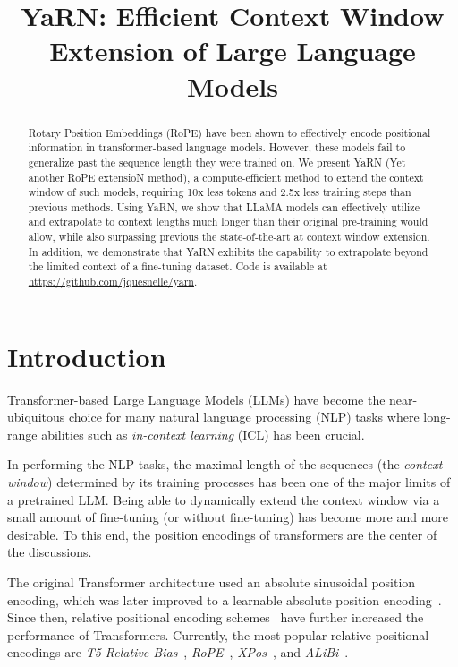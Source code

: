 \title{YaRN: Efficient Context Window Extension of Large Language Models}

\begin{abstract}
Rotary Position Embeddings (RoPE) have been shown to effectively encode positional information in transformer-based language models. However, these models fail to generalize past the sequence length they were trained on. We present YaRN (Yet another RoPE extensioN method), a compute-efficient method to extend the context window of such models, requiring 10x less tokens and 2.5x less training steps than previous methods. Using YaRN, we show that LLaMA models can effectively utilize and extrapolate to context lengths much longer than their original pre-training would allow, while also surpassing previous the state-of-the-art at context window extension. In addition, we demonstrate that YaRN exhibits the capability to extrapolate beyond the limited context of a fine-tuning dataset. Code is available at \url{https://github.com/jquesnelle/yarn}.
\end{abstract}

\section{Introduction}

Transformer-based Large Language Models\citep{vaswani2017attention} (LLMs) have become the near-ubiquitous choice for many natural language processing (NLP) tasks where long-range abilities such as \emph{in-context learning} (ICL) has been crucial.

In performing the NLP tasks, the maximal length of the sequences (the \emph{context window}) determined by its training processes has been one of the major limits of a pretrained LLM. Being able to dynamically extend the context window via a small amount of fine-tuning (or without fine-tuning) has become more and more desirable. To this end, the position encodings of transformers are the center of the discussions.

The original Transformer architecture used an absolute sinusoidal position encoding, which was later improved to a learnable absolute position encoding~\citep{gehring2017convolutional}. Since then, relative positional encoding schemes~\citep{shaw2018self} have further increased the performance of Transformers. Currently, the most popular relative positional encodings are \emph{T5 Relative Bias}~\citep{roberts2019t5}, \emph{RoPE}~\citep{su2022roformer}, \emph{XPos}~\citep{sun2022lengthextrapolatable}, and \emph{ALiBi}~\citep{press2022train}.

